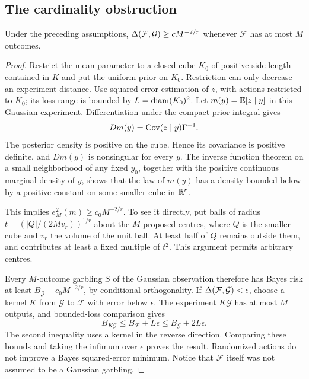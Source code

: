 \subsection{The cardinality obstruction}
\begin{lemma}\label{lem:v7-cardinality}
Under the preceding assumptions,
$\Delta(\mathcal F,\mathcal G)\ge cM^{-2/r}$ whenever
$\mathcal F$ has at most $M$ outcomes.
\end{lemma}
\begin{proof}
Restrict the mean parameter to a closed cube $K_0$ of positive side
length contained in $K$ and put the uniform prior on $K_0$. Restriction
can only decrease an experiment distance. Use squared-error estimation
of $z$, with actions restricted to $K_0$; its loss range is bounded by
$L=\operatorname{diam}(K_0)^2$. Let $m(y)=\mathbb E[z\mid y]$ in this Gaussian experiment.
Differentiation under the compact prior integral gives
\begin{equation}
                    Dm(y)=\operatorname{Cov}(z\mid y)\Gamma^{-1}.    \label{eq:v7-posterior-jacobian}
\end{equation}
The posterior density is positive on the cube. Hence its covariance is
positive definite, and $Dm(y)$ is nonsingular for every $y$. The inverse
function theorem on a small neighborhood of any fixed $y_0$, together
with the positive continuous marginal density of $y$, shows that the
law of $m(y)$ has a density bounded below by a positive constant on
some smaller cube in $\mathbb R^r$.

This implies $e_M^2(m)\ge c_0 M^{-2/r}$. To see it directly, put balls
of radius $t=(|Q|/(2M v_r))^{1/r}$ about the $M$ proposed centres, where
$Q$ is the smaller cube and $v_r$ the volume of the unit ball. At least
half of $Q$ remains outside them, and contributes at least a fixed
multiple of $t^2$. This argument permits arbitrary centres.

Every $M$-outcome garbling $S$ of the Gaussian observation therefore has
Bayes risk at least $B_{\mathcal G}+c_0M^{-2/r}$, by conditional
orthogonality. If $\Delta(\mathcal F,\mathcal G)<\epsilon$, choose a
kernel $K$ from $\mathcal G$ to $\mathcal F$ with error below $\epsilon$.
The experiment $K\mathcal G$ has at most $M$ outputs, and bounded-loss
comparison gives
\[
 B_{K\mathcal G}\le B_{\mathcal F}+L\epsilon
                  \le B_{\mathcal G}+2L\epsilon.
\]
The second inequality uses a kernel in the reverse direction. Comparing
these bounds and taking the infimum over $\epsilon$ proves the result.
Randomized actions do not improve a Bayes squared-error minimum. Notice
that $\mathcal F$ itself was not assumed to be a Gaussian garbling.
\end{proof}


